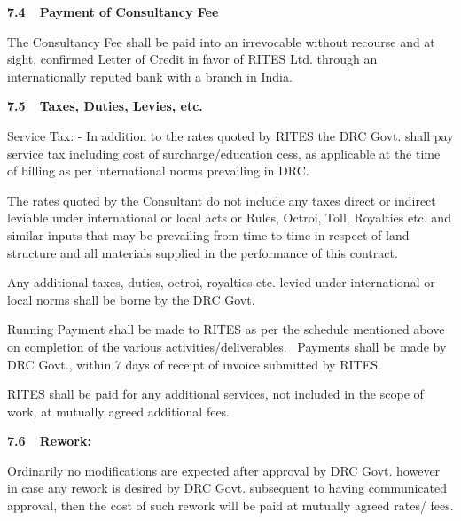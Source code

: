

{\bfseries\color[rgb]{0.4392157,0.1882353,0.627451}
7.4\ \ Payment of Consultancy Fee}


\bigskip

The Consultancy Fee shall be paid into an irrevocable without recourse and at sight, confirmed Letter of Credit in favor
of RITES Ltd. through an internationally reputed bank with a branch in India.


\bigskip

{\bfseries\color[rgb]{0.4392157,0.1882353,0.627451}
7.5\ \ Taxes, Duties, Levies, etc.}


\bigskip

Service Tax: - In addition to the rates quoted by RITES the DRC Govt. shall pay service tax including cost of
surcharge/education cess, as applicable at the time of billing as per international norms prevailing in DRC.


\bigskip

The rates quoted by the Consultant do not include any taxes direct or indirect leviable under international or local
acts or Rules, Octroi, Toll, Royalties etc. and similar inputs that may be prevailing from time to time in respect of
land structure and all materials supplied in the performance of this contract.


\bigskip

Any additional taxes, duties, octroi, royalties etc. levied under international or local norms shall be borne by the DRC
Govt.

Running Payment shall be made to RITES as per the schedule mentioned above on completion of the various
activities/deliverables. \ Payments shall be made by DRC Govt., within 7 days of receipt of invoice submitted by RITES.


\bigskip

RITES shall be paid for any additional services, not included in the scope of work, at mutually agreed additional fees.


\bigskip

{\bfseries\color[rgb]{0.4392157,0.1882353,0.627451}
7.6\ \ Rework:}


\bigskip

Ordinarily no modifications are expected after approval by DRC Govt. however in case any rework is desired by DRC Govt.
subsequent to having communicated approval, then the cost of such rework will be paid at mutually agreed rates/ fees.
